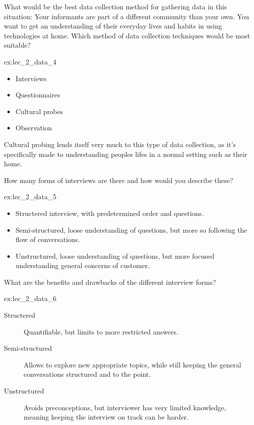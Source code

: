 \begin{exercise}{\parbox{\linewidth*3/4}{What would be the best data collection method for gathering data in this situation: Your informants are part of a different community than your own. You want to get an understanding of their everyday lives and habits in using technologies at home. Which method of data collection techniques would be most suitable?}}{ex:lec_2_data_4}
    \begin{itemize}
        \item Interviews 
        \item Questionnaires 
        \item Cultural probes \checkmark
        \item Observation 
    \end{itemize}
    Cultural probing lends itself very much to this type of data collection, as it's specifically made to understanding peoples lifes in a normal setting such as their home.
\end{exercise}

\begin{exercise}{\parbox{\linewidth*3/4}{How many forms of interviews are there and how would you describe these?}}{ex:lec_2_data_5}
    \begin{itemize}
        \item Structered interview, with predetermined order and questions.
        \item Semi-structured, loose understanding of questions, but more so following the flow of conversations.
        \item Unstructured, loose understanding of questions, but more focused understanding general concerns of customer.
    \end{itemize}
\end{exercise}

\begin{exercise}{\parbox{\linewidth*3/4}{What are the benefits and drawbacks of the different interview forms?}}{ex:lec_2_data_6}
    \begin{description}
        \item[Structered] Quantifiable, but limits to more restricted answers.
        \item[Semi-structured] Allows to explore new appropriate topics, while still keeping the general conversations structured and to the point.
        \item[Unstructured] Avoids preconceptions, but interviewer has very limited knowledge, meaning keeping the interview on track can be harder.
    \end{description}
\end{exercise}

